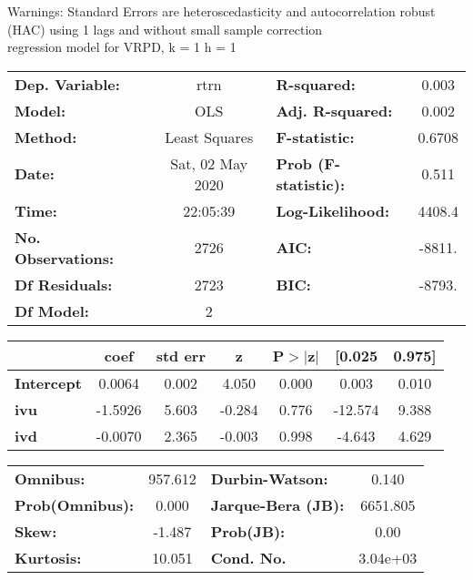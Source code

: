Warnings: \newline
 [1] Standard Errors are heteroscedasticity and autocorrelation robust (HAC) using 1 lags and without small sample correction\\ 

regression model for VRPD, k = 1 h = 1\begin{center}
\begin{tabular}{lclc}
\toprule
\textbf{Dep. Variable:}    &       rtrn       & \textbf{  R-squared:         } &     0.003   \\
\textbf{Model:}            &       OLS        & \textbf{  Adj. R-squared:    } &     0.002   \\
\textbf{Method:}           &  Least Squares   & \textbf{  F-statistic:       } &    0.6708   \\
\textbf{Date:}             & Sat, 02 May 2020 & \textbf{  Prob (F-statistic):} &    0.511    \\
\textbf{Time:}             &     22:05:39     & \textbf{  Log-Likelihood:    } &    4408.4   \\
\textbf{No. Observations:} &        2726      & \textbf{  AIC:               } &    -8811.   \\
\textbf{Df Residuals:}     &        2723      & \textbf{  BIC:               } &    -8793.   \\
\textbf{Df Model:}         &           2      & \textbf{                     } &             \\
\bottomrule
\end{tabular}
\begin{tabular}{lcccccc}
                   & \textbf{coef} & \textbf{std err} & \textbf{z} & \textbf{P$> |$z$|$} & \textbf{[0.025} & \textbf{0.975]}  \\
\midrule
\textbf{Intercept} &       0.0064  &        0.002     &     4.050  &         0.000        &        0.003    &        0.010     \\
\textbf{ivu}       &      -1.5926  &        5.603     &    -0.284  &         0.776        &      -12.574    &        9.388     \\
\textbf{ivd}       &      -0.0070  &        2.365     &    -0.003  &         0.998        &       -4.643    &        4.629     \\
\bottomrule
\end{tabular}
\begin{tabular}{lclc}
\textbf{Omnibus:}       & 957.612 & \textbf{  Durbin-Watson:     } &    0.140  \\
\textbf{Prob(Omnibus):} &   0.000 & \textbf{  Jarque-Bera (JB):  } & 6651.805  \\
\textbf{Skew:}          &  -1.487 & \textbf{  Prob(JB):          } &     0.00  \\
\textbf{Kurtosis:}      &  10.051 & \textbf{  Cond. No.          } & 3.04e+03  \\
\bottomrule
\end{tabular}
\end{center}

